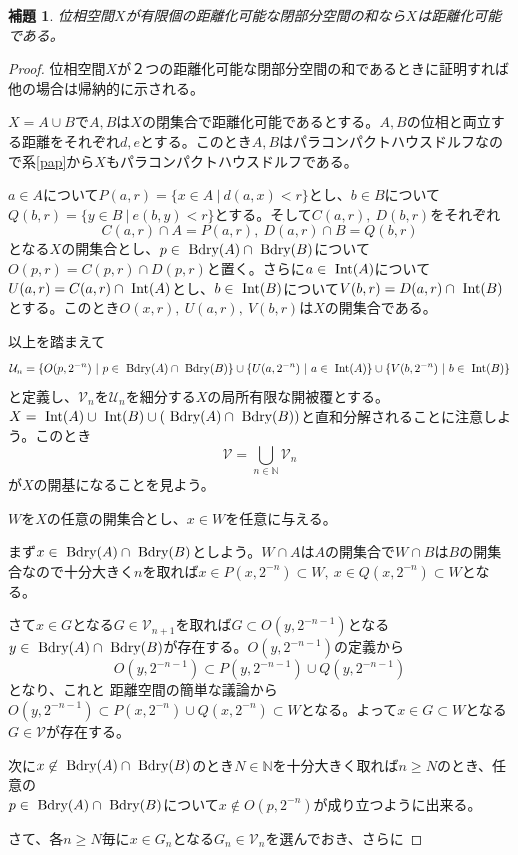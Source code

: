 \documentclass[leqno]{jsarticle}
\newtheorem{lem}[thm]{補題}
\newcommand{\nn}{\mathbb{N}}
\newcommand{\bd}{\text{  {\rm Bdry}} }
\newcommand{\nai}{\text{  {\rm Int}} }
\newcommand{\uu}{\mathcal{U}}
\newcommand{\vv}{\mathcal{V}}
\begin{document}
\setcounter{equation}{0}
\begin{lem}\label{bb}
位相空間$X$が有限個の距離化可能な閉部分空間の和なら$X$は距離化可能である。
\end{lem}
\begin{proof}
位相空間$X$が２つの距離化可能な閉部分空間の和であるときに証明すれば他の場合は帰納的に示される。\par
$X=A\cup B$で$A,B$は$X$の閉集合で距離化可能であるとする。$A,B$の位相と両立する距離をそれぞれ$d,e$とする。このとき$A,B$はパラコンパクトハウスドルフなので系\ref{pap}から$X$もパラコンパクトハウスドルフである。\par
$a\in A$について$P(a,r)=\{x\in A\ |\ d(a,x)<r\}$とし、$b\in B$について
$Q(b,r)=\{y\in B\ |\ e(b,y)<r\}$とする。そして$C(a,r),\ D(b,r)$をそれぞれ
\[
C(a,r)\cap A=P(a,r),\ D(a,r)\cap B=Q(b,r)
\]
となる$X$の開集合とし、$p\in \bd(A)\cap \bd(B)$について$O(p,r)=C(p,r)\cap D(p,r)$と置く。さらに$a\in \nai(A)$について$U(a,r)=C(a,r)\cap \nai (A)$とし、$b\in \nai (B)$について$V(b,r)=D(a,r)\cap \nai(B)$とする。このとき$O(x,r),\ U(a,r),\ V(b,r)$は$X$の開集合である。\par
以上を踏まえて
\[
\uu_n=\{O(p,2^{-n})\ |\ p\in \bd(A)\cap \bd(B)\}\cup \{U(a,2^{-n})\ |\ a\in \nai (A)\}\cup \{V(b,2^{-n})\ |\ b\in \nai(B)\}
\]
と定義し、$\vv_n$を$\uu_n$を細分する$X$の局所有限な開被覆とする。$X=\nai(A)\cup \nai (B)\cup (\bd(A)\cap \bd(B))$と直和分解されることに注意しよう。このとき
\[
\vv=\bigcup_{n\in \nn}\vv_n
\]
が$X$の開基になることを見よう。\par
$W$を$X$の任意の開集合とし、$x\in W$を任意に与える。\par
まず$x\in \bd(A)\cap\bd(B)$としよう。$W\cap A$は$A$の開集合で$W\cap B$は$B$の開集合なので十分大きく$n$を取れば$x\in P(x,2^{-n})\subset W,\ x\in Q(x,2^{-n})\subset W$となる。\par
さて$x\in G$となる$G\in \vv_{n+1}$を取れば$G\subset O(y,2^{-n-1})$となる$y\in \bd(A)\cap \bd(B)$が存在する。$O(y,2^{-n-1})$の定義から
\[
O(y,2^{-n-1})\subset P(y,2^{-n-1})\cup Q(y,2^{-n-1})
\]
となり、これと
距離空間の簡単な議論から$O(y,2^{-n-1})\subset P(x,2^{-n})\cup Q(x,2^{-n})\subset W$となる。よって$x\in G\subset W$となる$G\in \vv$が存在する。\par
次に$x\not\in \bd(A)\cap \bd(B)$のとき$N\in \nn$を十分大きく取れば$n\ge N$のとき、任意の\\
$p\in \bd(A)\cap \bd(B)$について$x\not\in O(p,2^{-n})$が成り立つように出来る。\par
さて、各$n\ge N$毎に$x\in G_n$となる$G_n\in \vv_n$を選んでおき、さらに

\end{proof}
\end{document}
